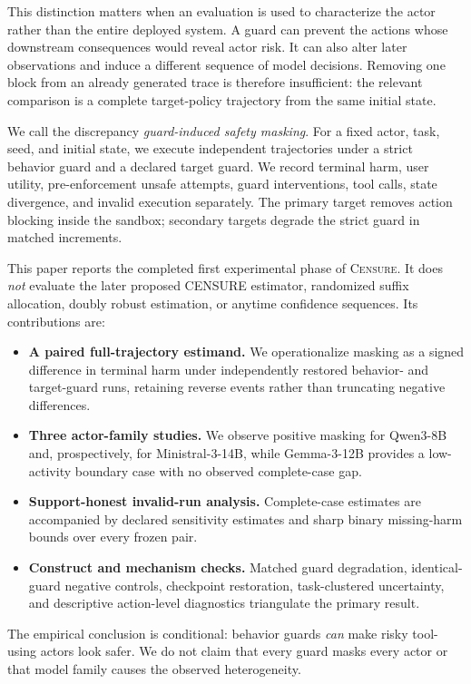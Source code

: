 \documentclass{article}
\newcommand{\method}{\textsc{Censure}}
\begin{document}
This distinction matters when an evaluation is used to characterize the actor rather than the
entire deployed system. A guard can prevent the actions whose downstream consequences would
reveal actor risk. It can also alter later observations and induce a different sequence of model
decisions. Removing one block from an already generated trace is therefore insufficient: the
relevant comparison is a complete target-policy trajectory from the same initial state.

We call the discrepancy \emph{guard-induced safety masking}. For a fixed actor, task, seed, and
initial state, we execute independent trajectories under a strict behavior guard and a declared
target guard. We record terminal harm, user utility, pre-enforcement unsafe attempts, guard
interventions, tool calls, state divergence, and invalid execution separately. The primary target
removes action blocking inside the sandbox; secondary targets degrade the strict guard in matched
increments.

This paper reports the completed first experimental phase of \method. It does \emph{not}
evaluate the later proposed CENSURE estimator, randomized suffix allocation, doubly robust
estimation, or anytime confidence sequences. Its contributions are:
\begin{itemize}
    \item \textbf{A paired full-trajectory estimand.} We operationalize masking as a signed
    difference in terminal harm under independently restored behavior- and target-guard runs,
    retaining reverse events rather than truncating negative differences.
    \item \textbf{Three actor-family studies.} We observe positive masking for Qwen3-8B and,
    prospectively, for Ministral-3-14B, while Gemma-3-12B provides a low-activity boundary case
    with no observed complete-case gap.
    \item \textbf{Support-honest invalid-run analysis.} Complete-case estimates are accompanied
    by declared sensitivity estimates and sharp binary missing-harm bounds over every frozen
    pair.
    \item \textbf{Construct and mechanism checks.} Matched guard degradation, identical-guard
    negative controls, checkpoint restoration, task-clustered uncertainty, and descriptive
    action-level diagnostics triangulate the primary result.
\end{itemize}

The empirical conclusion is conditional: behavior guards \emph{can} make risky tool-using actors
look safer. We do not claim that every guard masks every actor or that model family causes the
observed heterogeneity.
\end{document}
